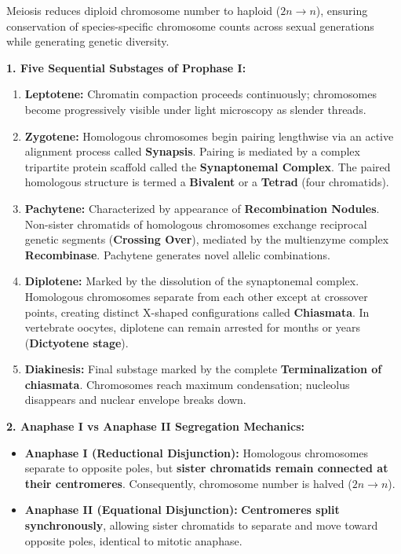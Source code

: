 \documentclass[10pt,twoside,openright]{book}
\begin{document}
\begin{conceptbox}
Meiosis reduces diploid chromosome number to haploid ($2n \to n$), ensuring conservation of species-specific chromosome counts across sexual generations while generating genetic diversity.

\textbf{1. Five Sequential Substages of Prophase I:}
\begin{enumerate}[leftmargin=*]
  \item \textbf{Leptotene:} Chromatin compaction proceeds continuously; chromosomes become progressively visible under light microscopy as slender threads.
  \item \textbf{Zygotene:} Homologous chromosomes begin pairing lengthwise via an active alignment process called \textbf{Synapsis}. Pairing is mediated by a complex tripartite protein scaffold called the \textbf{Synaptonemal Complex}. The paired homologous structure is termed a \textbf{Bivalent} or a \textbf{Tetrad} (four chromatids).
  \item \textbf{Pachytene:} Characterized by appearance of \textbf{Recombination Nodules}. Non-sister chromatids of homologous chromosomes exchange reciprocal genetic segments (\textbf{Crossing Over}), mediated by the multienzyme complex \textbf{Recombinase}. Pachytene generates novel allelic combinations.
  \item \textbf{Diplotene:} Marked by the dissolution of the synaptonemal complex. Homologous chromosomes separate from each other except at crossover points, creating distinct X-shaped configurations called \textbf{Chiasmata}. In vertebrate oocytes, diplotene can remain arrested for months or years (\textbf{Dictyotene stage}).
  \item \textbf{Diakinesis:} Final substage marked by the complete \textbf{Terminalization of chiasmata}. Chromosomes reach maximum condensation; nucleolus disappears and nuclear envelope breaks down.
\end{enumerate}

\textbf{2. Anaphase I vs Anaphase II Segregation Mechanics:}
\begin{itemize}
  \item \textbf{Anaphase I (Reductional Disjunction):} Homologous chromosomes separate to opposite poles, but \textbf{sister chromatids remain connected at their centromeres}. Consequently, chromosome number is halved ($2n \to n$).
  \item \textbf{Anaphase II (Equational Disjunction):} \textbf{Centromeres split synchronously}, allowing sister chromatids to separate and move toward opposite poles, identical to mitotic anaphase.
\end{itemize}
\end{conceptbox}
\end{document}
